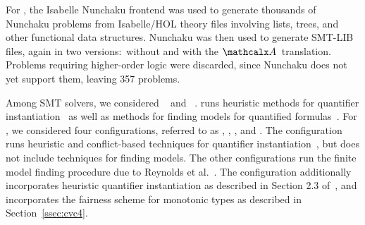 For \isanun, the Isabelle Nunchaku frontend was used to generate thousands of
Nunchaku problems from Isabelle/HOL theory files involving lists, trees, and
other functional data structures. Nunchaku was then used to generate SMT-LIB
files, again in two versions:\ without and with the $\conv$~translation.
Problems requiring higher-order logic were discarded, since Nunchaku does not
yet support them, leaving 357 problems.





Among SMT solvers, we considered \ziii~\cite{de-moura-bjoerner-2008} and
\cvc~\cite{barrett-et-al-2011}.
\ziii runs heuristic methods for quantifier instantiation~\cite{MouraBjoerner07}
as well as methods for finding models for quantified formulas~\cite{GeDeM-CAV-09}.
For \cvc, we considered four configurations, referred
to as \cvcd, \cvcf, \cvcfe, and \cvcfm.
The configuration \cvcd runs heuristic
and conflict-based techniques for quantifier instantiation~\cite{ReynoldsTinelliMoura14},
but does not include techniques for finding models.
The other configurations run the finite model
finding procedure due to Reynolds et al.\ \cite{ReyEtAl-1-RR-13,reynolds-et-al-2013}.
The configuration \cvcfe additionally incorporates heuristic quantifier instantiation as described in Section 2.3 of~\cite{reynolds-et-al-2013},
and \cvcfm incorporates the fairness scheme for monotonic types as described in Section~\ref{ssec:cvc4}.

